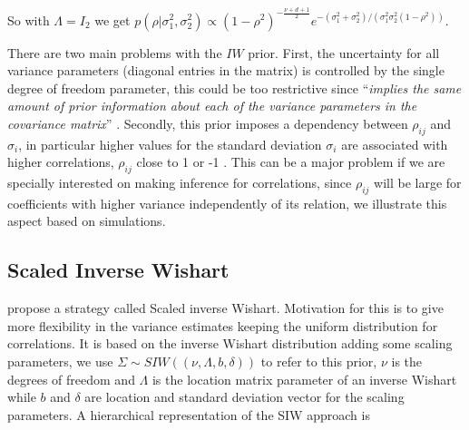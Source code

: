 \documentclass{article}
\begin{document}
So with $\Lambda = I_2$ we get $p(\rho \vert \sigma_1^2,\sigma_2^2) \propto  (1-\rho^2)^{-\frac{\nu+d+1}{2}}e^{-(\sigma_1^2+\sigma_2^2)/(\sigma_1^2 \sigma_2^2(1-\rho^2))}$. 
 
There are two main problems with the $IW$ prior. 
First, the uncertainty for all variance parameters (diagonal entries in the matrix) is controlled by the single degree of freedom parameter, this could  be too restrictive since ``\textit{implies the same amount of prior information about each of the variance parameters in the covariance matrix}'' \citep{bda2003}. Secondly, this prior imposes a dependency between $\rho_{ij}$ and $\sigma_i$, in particular higher values for the standard deviation $\sigma_i$ are associated with higher correlations, $\rho_{ij}$ close to 1 or -1 \citep{visualize}.  This can be a major problem if we are specially interested on making inference for correlations, since $\rho_{ij}$ will be large for coefficients with higher variance independently of its relation,  we illustrate this aspect based on simulations. 

 
\subsection{Scaled Inverse Wishart}
\cite{odomain} propose a strategy called Scaled inverse Wishart. Motivation for this is to give more flexibility in the variance estimates keeping the uniform distribution for correlations. It is based on the inverse Wishart distribution adding some scaling parameters, we use $\Sigma \sim SIW((\nu, \Lambda, b, \delta))$ to refer to this prior, $\nu$ is the degrees of freedom and $\Lambda$ is the location matrix parameter of an inverse Wishart while $b$ and $\delta$ are location and standard deviation vector for the scaling parameters. A hierarchical representation of the SIW approach is  
\end{document}
